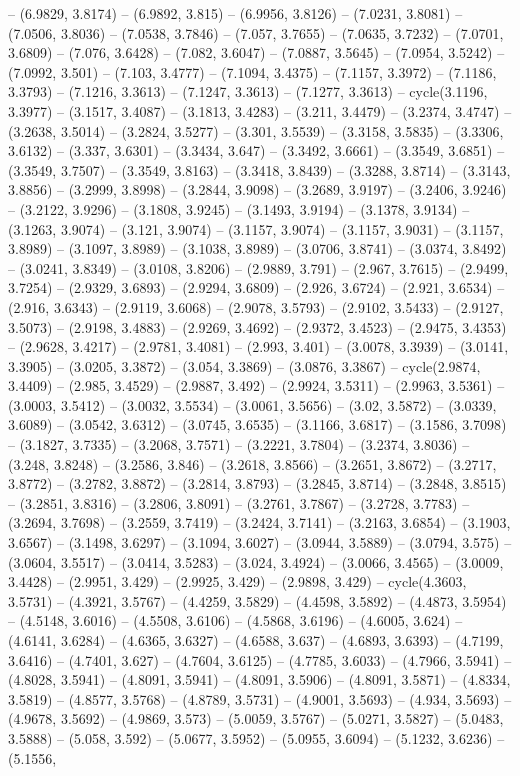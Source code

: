 -- (6.9829, 3.8174) -- (6.9892, 3.815) -- (6.9956, 3.8126) -- (7.0231, 3.8081) -- (7.0506, 3.8036) -- (7.0538, 3.7846) -- (7.057, 3.7655) -- (7.0635, 3.7232) -- (7.0701, 3.6809) -- (7.076, 3.6428) -- (7.082, 3.6047) -- (7.0887, 3.5645) -- (7.0954, 3.5242) -- (7.0992, 3.501) -- (7.103, 3.4777) -- (7.1094, 3.4375) -- (7.1157, 3.3972) -- (7.1186, 3.3793) -- (7.1216, 3.3613) -- (7.1247, 3.3613) -- (7.1277, 3.3613) -- cycle(3.1196, 3.3977) -- (3.1517, 3.4087) -- (3.1813, 3.4283) -- (3.211, 3.4479) -- (3.2374, 3.4747) -- (3.2638, 3.5014) -- (3.2824, 3.5277) -- (3.301, 3.5539) -- (3.3158, 3.5835) -- (3.3306, 3.6132) -- (3.337, 3.6301) -- (3.3434, 3.647) -- (3.3492, 3.6661) -- (3.3549, 3.6851) -- (3.3549, 3.7507) -- (3.3549, 3.8163) -- (3.3418, 3.8439) -- (3.3288, 3.8714) -- (3.3143, 3.8856) -- (3.2999, 3.8998) -- (3.2844, 3.9098) -- (3.2689, 3.9197) -- (3.2406, 3.9246) -- (3.2122, 3.9296) -- (3.1808, 3.9245) -- (3.1493, 3.9194) -- (3.1378, 3.9134) -- (3.1263, 3.9074) -- (3.121, 3.9074) -- (3.1157, 3.9074) -- (3.1157, 3.9031) -- (3.1157, 3.8989) -- (3.1097, 3.8989) -- (3.1038, 3.8989) -- (3.0706, 3.8741) -- (3.0374, 3.8492) -- (3.0241, 3.8349) -- (3.0108, 3.8206) -- (2.9889, 3.791) -- (2.967, 3.7615) -- (2.9499, 3.7254) -- (2.9329, 3.6893) -- (2.9294, 3.6809) -- (2.926, 3.6724) -- (2.921, 3.6534) -- (2.916, 3.6343) -- (2.9119, 3.6068) -- (2.9078, 3.5793) -- (2.9102, 3.5433) -- (2.9127, 3.5073) -- (2.9198, 3.4883) -- (2.9269, 3.4692) -- (2.9372, 3.4523) -- (2.9475, 3.4353) -- (2.9628, 3.4217) -- (2.9781, 3.4081) -- (2.993, 3.401) -- (3.0078, 3.3939) -- (3.0141, 3.3905) -- (3.0205, 3.3872) -- (3.054, 3.3869) -- (3.0876, 3.3867) -- cycle(2.9874, 3.4409) -- (2.985, 3.4529) -- (2.9887, 3.492) -- (2.9924, 3.5311) -- (2.9963, 3.5361) -- (3.0003, 3.5412) -- (3.0032, 3.5534) -- (3.0061, 3.5656) -- (3.02, 3.5872) -- (3.0339, 3.6089) -- (3.0542, 3.6312) -- (3.0745, 3.6535) -- (3.1166, 3.6817) -- (3.1586, 3.7098) -- (3.1827, 3.7335) -- (3.2068, 3.7571) -- (3.2221, 3.7804) -- (3.2374, 3.8036) -- (3.248, 3.8248) -- (3.2586, 3.846) -- (3.2618, 3.8566) -- (3.2651, 3.8672) -- (3.2717, 3.8772) -- (3.2782, 3.8872) -- (3.2814, 3.8793) -- (3.2845, 3.8714) -- (3.2848, 3.8515) -- (3.2851, 3.8316) -- (3.2806, 3.8091) -- (3.2761, 3.7867) -- (3.2728, 3.7783) -- (3.2694, 3.7698) -- (3.2559, 3.7419) -- (3.2424, 3.7141) -- (3.2163, 3.6854) -- (3.1903, 3.6567) -- (3.1498, 3.6297) -- (3.1094, 3.6027) -- (3.0944, 3.5889) -- (3.0794, 3.575) -- (3.0604, 3.5517) -- (3.0414, 3.5283) -- (3.024, 3.4924) -- (3.0066, 3.4565) -- (3.0009, 3.4428) -- (2.9951, 3.429) -- (2.9925, 3.429) -- (2.9898, 3.429) -- cycle(4.3603, 3.5731) -- (4.3921, 3.5767) -- (4.4259, 3.5829) -- (4.4598, 3.5892) -- (4.4873, 3.5954) -- (4.5148, 3.6016) -- (4.5508, 3.6106) -- (4.5868, 3.6196) -- (4.6005, 3.624) -- (4.6141, 3.6284) -- (4.6365, 3.6327) -- (4.6588, 3.637) -- (4.6893, 3.6393) -- (4.7199, 3.6416) -- (4.7401, 3.627) -- (4.7604, 3.6125) -- (4.7785, 3.6033) -- (4.7966, 3.5941) -- (4.8028, 3.5941) -- (4.8091, 3.5941) -- (4.8091, 3.5906) -- (4.8091, 3.5871) -- (4.8334, 3.5819) -- (4.8577, 3.5768) -- (4.8789, 3.5731) -- (4.9001, 3.5693) -- (4.934, 3.5693) -- (4.9678, 3.5692) -- (4.9869, 3.573) -- (5.0059, 3.5767) -- (5.0271, 3.5827) -- (5.0483, 3.5888) -- (5.058, 3.592) -- (5.0677, 3.5952) -- (5.0955, 3.6094) -- (5.1232, 3.6236) -- (5.1556, 